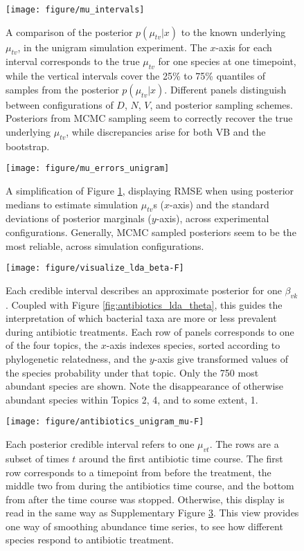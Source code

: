 \documentclass[oupdraft]{bio}
\begin{document}
\begin{figure}[ht]
  \centering
  \texttt{[image: figure/mu\_intervals]}
  \caption{
    A comparison of the posterior $p\left(\mu_{tv} \vert x\right)$ to the known
    underlying $\mu_{tv}$, in the unigram simulation experiment. The $x$-axis
    for each interval corresponds to the true $\mu_{tv}$ for one species at one
    timepoint, while the vertical intervals cover the 25\% to 75\% quantiles of
    samples from the posterior $p\left(\mu_{tv} \vert x\right)$. Different
    panels distinguish between configurations of $D$, $N$, $V$, and posterior
    sampling schemes. Posteriors from MCMC sampling seem to correctly recover
    the true underlying $\mu_{tv}$, while discrepancies arise for both VB and
    the bootstrap.
    \label{fig:mu_intervals} }
\end{figure}

\begin{figure}[ht]
  \centering
  \texttt{[image: figure/mu\_errors\_unigram]}
  \caption{A simplification of Figure \ref{fig:mu_intervals}, displaying RMSE when
    using posterior medians to estimate simulation $\mu_{tv}$s ($x$-axis) and
    the standard deviations of posterior marginals ($y$-axis), across
    experimental configurations. Generally, MCMC sampled posteriors seem to be
    the most reliable, across simulation configurations.
    \label{fig:mu_errors_unigram}
  }
\end{figure}

\begin{figure}[!p]
  \centering\texttt{[image: figure/visualize\_lda\_beta-F]}
  \caption{Each credible interval describes an approximate posterior for one
    $\beta_{vk}$. Coupled with Figure \ref{fig:antibiotics_lda_theta}, this
    guides the interpretation of which bacterial taxa are more or less prevalent
    during antibiotic treatments. Each row of panels corresponds to one of the
    four topics, the $x$-axis indexes species, sorted according to phylogenetic
    relatedness, and the $y$-axis give transformed values of the species probability
    under that topic. Only the 750 most abundant species are shown. Note the
    disappearance of otherwise abundant species within Topics 2, 4, and to some
    extent, 1.}
  \label{fig:antibiotics_lda_beta}
\end{figure}

\begin{figure}[!p]
  \centering
  \texttt{[image: figure/antibiotics\_unigram\_mu-F]}
  \caption{Each posterior credible interval refers to one $\mu_{vt}$. The rows
    are a subset of times $t$ around the first antibiotic time course. The first
    row corresponds to a timepoint from before the treatment, the middle two
    from during the antibiotics time course, and the bottom from after the time
    course was stopped. Otherwise, this display is read in the same way as
    Supplementary Figure \ref{fig:antibiotics_lda_beta}. This view provides one
    way of smoothing abundance time series, to see how different species respond
    to antibiotic treatment. \label{fig:antibiotics_unigram_theta} }
\end{figure}
\end{document}
